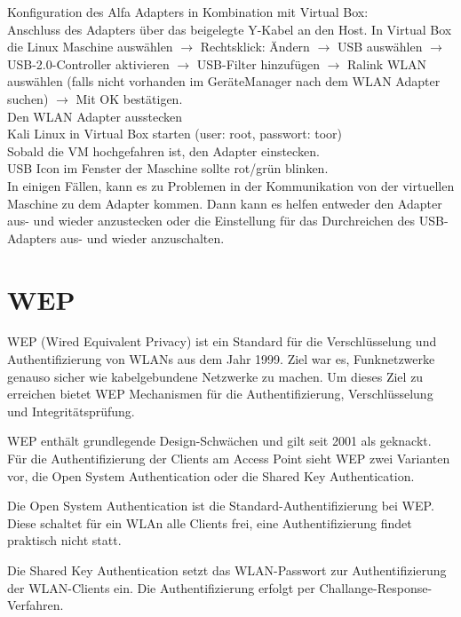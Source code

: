 Konfiguration des Alfa Adapters in Kombination mit Virtual Box:\\

Anschluss des Adapters über das beigelegte Y-Kabel an den Host.
In Virtual Box die Linux Maschine auswählen $\rightarrow$ Rechtsklick: Ändern $\rightarrow$ USB auswählen $\rightarrow$ USB-2.0-Controller aktivieren $\rightarrow$ USB-Filter hinzufügen
$\rightarrow$ Ralink WLAN auswählen (falls nicht vorhanden im GeräteManager nach dem WLAN Adapter suchen) $\rightarrow$ Mit OK bestätigen.\\
Den WLAN Adapter ausstecken\\

Kali Linux in Virtual Box starten (user: root, passwort: toor)\\
Sobald die VM hochgefahren ist, den Adapter einstecken.\\
USB Icon im Fenster der Maschine sollte rot/grün blinken.\\ %

In einigen Fällen, kann es zu Problemen in der Kommunikation von der virtuellen Maschine zu dem Adapter kommen. 
Dann kann es helfen entweder den Adapter aus- und wieder anzustecken oder die Einstellung für das Durchreichen des USB-Adapters aus- und wieder anzuschalten.


\section{WEP}
WEP (Wired Equivalent Privacy) ist ein Standard für die Verschlüsselung und Authentifizierung von WLANs aus dem Jahr 1999. Ziel war es, Funknetzwerke genauso sicher wie kabelgebundene Netzwerke zu machen. Um dieses Ziel zu erreichen bietet WEP Mechanismen für die Authentifizierung, Verschlüsselung und Integritätsprüfung. 

WEP enthält grundlegende Design-Schwächen und gilt seit 2001 als geknackt. 
Für die Authentifizierung der Clients am Access Point sieht WEP zwei Varianten vor, die Open System Authentication oder die Shared Key Authentication. 

Die Open System Authentication ist die Standard-Authentifizierung bei WEP. Diese schaltet für ein WLAn alle Clients frei, eine Authentifizierung findet praktisch nicht statt.

Die Shared Key Authentication setzt das WLAN-Passwort zur Authentifizierung der WLAN-Clients ein. Die Authentifizierung erfolgt per Challange-Response-Verfahren. 

